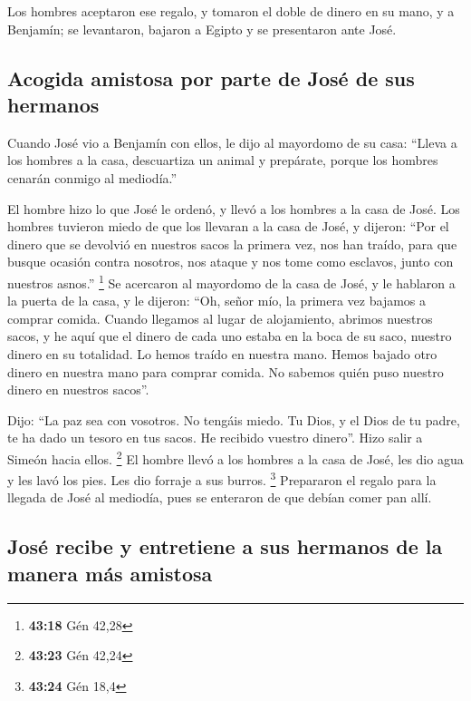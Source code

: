  Los hombres aceptaron ese regalo, y tomaron el doble de
dinero en su mano, y a Benjamín; se levantaron, bajaron a Egipto y se
presentaron ante José.

\hypertarget{acogida-amistosa-por-parte-de-josuxe9-de-sus-hermanos}{%
\subsection{Acogida amistosa por parte de José de sus
hermanos}\label{acogida-amistosa-por-parte-de-josuxe9-de-sus-hermanos}}

 Cuando José vio a Benjamín con ellos, le dijo al
mayordomo de su casa: ``Lleva a los hombres a la casa, descuartiza un
animal y prepárate, porque los hombres cenarán conmigo al mediodía.''

 El hombre hizo lo que José le ordenó, y llevó a los
hombres a la casa de José.  Los hombres tuvieron miedo de
que los llevaran a la casa de José, y dijeron: ``Por el dinero que se
devolvió en nuestros sacos la primera vez, nos han traído, para que
busque ocasión contra nosotros, nos ataque y nos tome como esclavos,
junto con nuestros asnos.'' \footnote{\textbf{43:18} Gén 42,28}
 Se acercaron al mayordomo de la casa de José, y le
hablaron a la puerta de la casa,  y le dijeron: ``Oh,
señor mío, la primera vez bajamos a comprar comida. 
Cuando llegamos al lugar de alojamiento, abrimos nuestros sacos, y he
aquí que el dinero de cada uno estaba en la boca de su saco, nuestro
dinero en su totalidad. Lo hemos traído en nuestra mano. 
Hemos bajado otro dinero en nuestra mano para comprar comida. No sabemos
quién puso nuestro dinero en nuestros sacos''.

 Dijo: ``La paz sea con vosotros. No tengáis miedo. Tu
Dios, y el Dios de tu padre, te ha dado un tesoro en tus sacos. He
recibido vuestro dinero''. Hizo salir a Simeón hacia ellos. \footnote{\textbf{43:23}
  Gén 42,24}  El hombre llevó a los hombres a la casa de
José, les dio agua y les lavó los pies. Les dio forraje a sus burros.
\footnote{\textbf{43:24} Gén 18,4}  Prepararon el regalo
para la llegada de José al mediodía, pues se enteraron de que debían
comer pan allí.

\hypertarget{josuxe9-recibe-y-entretiene-a-sus-hermanos-de-la-manera-muxe1s-amistosa}{%
\subsection{José recibe y entretiene a sus hermanos de la manera más
amistosa}\label{josuxe9-recibe-y-entretiene-a-sus-hermanos-de-la-manera-muxe1s-amistosa}}

